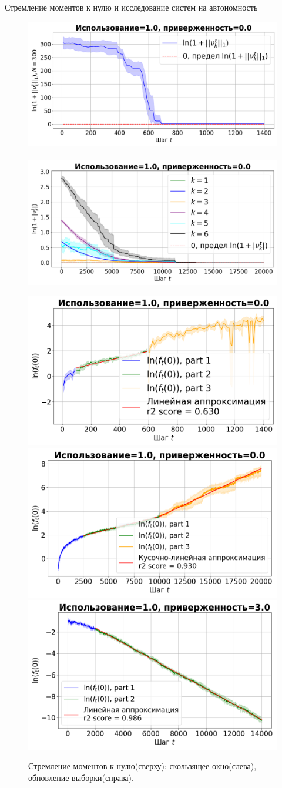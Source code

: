 \documentclass[aspectratio=169]{beamer}
\begin{document}
    \begin{frame}{Стремление моментов к нулю и исследование систем на автономность}
    \footnotesize
    \vspace{-2mm}
        \begin{figure}
            \centering
            \includegraphics[width=0.473\linewidth]{pictures/k_mom_sw_synthetic_sgd_model_50_1.0_0.0.png}~
            \includegraphics[width=0.473\linewidth]{pictures/k_mom_su_synthetic_sgd_model_50_1.0_0.0.png}
            
            \includegraphics[width=0.32\linewidth]{pictures/aut_sw_synthetic_sgd_model_50_1.0_0.0.png}
            \includegraphics[width=0.32\linewidth]{pictures/aut_su_synthetic_sgd_model_50_1.0_0.0.png}
            \includegraphics[width=0.32\linewidth]{pictures/aut_su_synthetic_sgd_model_50_1.0_3.0.png}
            \vspace{-5mm}
            \caption{Стремление моментов к нулю(сверху): скользящее окно(слева), обновление выборки(справа).
            }
        \end{figure}
    \end{frame}
\end{document}
